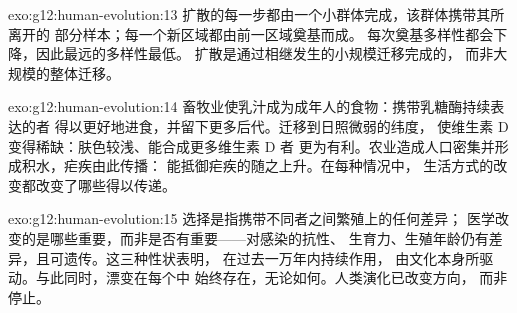 \begin{solution}{exo:g12:human-evolution:13}
扩散的每一步都由一个小群体完成，该群体携带其所离开的
部分样本；每一个新区域都由前一区域奠基而成。
每次奠基多样性都会下降，因此最远的多样性最低。
扩散是通过相继发生的小规模迁移完成的，
而非大规模的整体迁移。
\end{solution}

\begin{solution}{exo:g12:human-evolution:14}
畜牧业使乳汁成为成年人的食物：携带乳糖酶持续表达的者
得以更好地进食，并留下更多后代。迁移到日照微弱的纬度，
使维生素 D 变得稀缺：肤色较浅、能合成更多维生素 D 者
更为有利。农业造成人口密集并形成积水，疟疾由此传播：
能抵御疟疾的随之上升。在每种情况中，
生活方式的改变都改变了哪些得以传递。
\end{solution}

\begin{solution}{exo:g12:human-evolution:15}
选择是指携带不同者之间繁殖上的任何差异；
医学改变的是哪些重要，而非是否有重要——对感染的抗性、
生育力、生殖年龄仍有差异，且可遗传。这三种性状表明，
在过去一万年内持续作用，
由文化本身所驱动。与此同时，漂变在每个中
始终存在，无论如何。人类演化已改变方向，
而非停止。
\end{solution}

